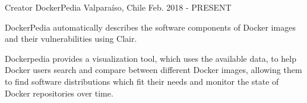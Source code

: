 \begin{cventries}
  \cventry
    {Creator}
    {DockerPedia}
    {Valparaíso, Chile}
    {Feb. 2018 - PRESENT}
    {
      \begin{cvitems}
        \item {DockerPedia automatically describes the software components of Docker images and their vulnerabilities using Clair.}
        \item {Dockerpedia provides a visualization tool, which uses the available data, to help Docker users search and compare between different Docker images, allowing them to find software distributions which fit their needs and monitor the state of Docker repositories over time.}
      \end{cvitems}
    }

\end{cventries}

